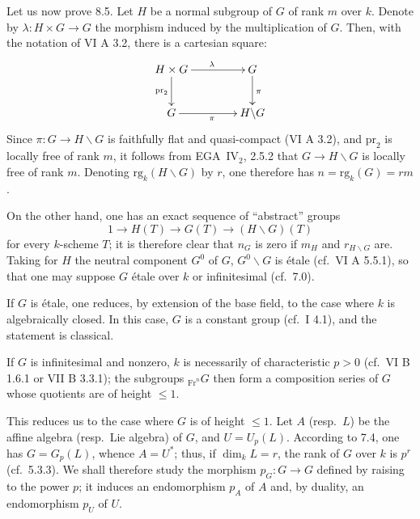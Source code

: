 Let us now prove 8.5. Let $H$ be a normal subgroup of $G$ of rank $m$ over $k$. Denote by $\lambda:H\times G\to G$ the morphism induced by the multiplication of $G$. Then, with the notation of VI A 3.2, there is a cartesian square:
\[
\xymatrix@C=4em{H\times G\ar[r]^\lambda\ar[d]_{\mathrm{pr}_2}&G\ar[d]^\pi\\G\ar[r]_\pi&H\backslash G}
\]
Since $\pi:G\to H\backslash G$ is faithfully flat and quasi-compact (VI A 3.2), and $\mathrm{pr}_2$ is locally free of rank $m$, it follows from EGA~IV$_2$, 2.5.2 that $G\to H\backslash G$ is locally free of rank $m$. Denoting $\mathrm{rg}_k(H\backslash G)$ by $r$, one therefore has $n=\mathrm{rg}_k(G)=rm$.

On the other hand, one has an exact sequence of ``abstract'' groups
\[
1\longrightarrow H(T)\longrightarrow G(T)\longrightarrow(H\backslash G)(T)
\]
for every $k$-scheme $T$; it is therefore clear that $n_G$ is zero if $m_H$ and $r_{H\backslash G}$ are. Taking for $H$ the neutral component $G^0$ of $G$, $G^0\backslash G$ is \'etale (cf.\ VI A 5.5.1), so that one may suppose $G$ \'etale over $k$ or infinitesimal (cf.\ 7.0).

If $G$ is \'etale, one reduces, by extension of the base field, to the case where $k$ is algebraically closed. In this case, $G$ is a constant group (cf.\ I 4.1), and the statement is classical.

If $G$ is infinitesimal and nonzero, $k$ is necessarily of characteristic $p>0$ (cf.\ VI B 1.6.1 or VII B 3.3.1); the subgroups ${}_{\mathrm{Fr}^n}G$ then form a composition series of $G$ whose quotients are of height $\leq1$.

This reduces us to the case where $G$ is of height $\leq1$. Let $A$ (resp.\ $L$) be the affine algebra (resp.\ Lie algebra) of $G$, and $U=U_p(L)$. According to 7.4, one has $G=G_p(L)$, whence $A=U^*$; thus, if $\dim_kL=r$, the rank of $G$ over $k$ is $p^r$ (cf.\ 5.3.3). We shall therefore study the morphism $p_G:G\to G$ defined by raising to the power $p$; it induces an endomorphism $p_A$ of $A$ and, by duality, an endomorphism $p_U$ of $U$.

